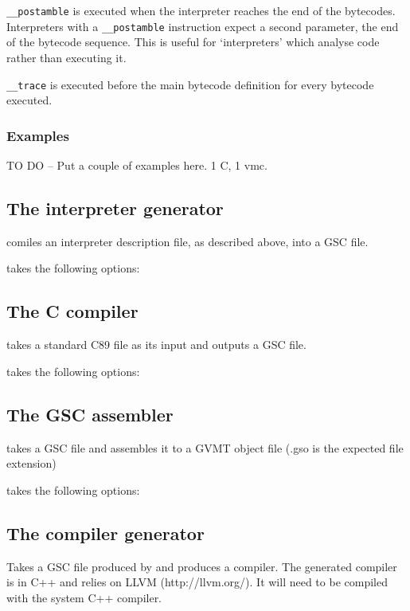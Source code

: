 \verb|__postamble| is executed when the interpreter reaches the end of the bytecodes. Interpreters with a \verb|__postamble| instruction expect a second parameter, the end of the bytecode sequence. This is useful for `interpreters' which analyse code rather than executing it.

\verb|__trace| is executed before the main bytecode definition for every bytecode executed.


\subsubsection*{Examples}


TO DO -- Put a couple of examples here. 1 C, 1 vmc.



\subsection{The interpreter generator \gvmtic{}\label{sect:gvmtic}}
\gvmtic{} comiles an interpreter description file, as described above, into a GSC file.

\gvmtic{} takes the following options:



\subsection{The C compiler \gvmtc{}\label{sect:gvmtc}}
\gvmtc{} takes a standard C89 file as its input and outputs a GSC file.

\gvmtc{} takes the following options:



\subsection{The GSC assembler \gvmtas{}\label{sect:gvmtas}}
\gvmtas{} takes a GSC file and assembles it to a GVMT object file (.gso is the expected file extension)

\gvmtas{} takes the following options:



\subsection{The compiler generator \gvmtcc{}\label{sect:gvmtcc}}
\gvmtcc{} Takes a GSC file produced by \gvmtic{} and produces a compiler. The generated compiler is in C++ and relies on LLVM (http://llvm.org/).
It will need to be compiled with the system C++ compiler.

